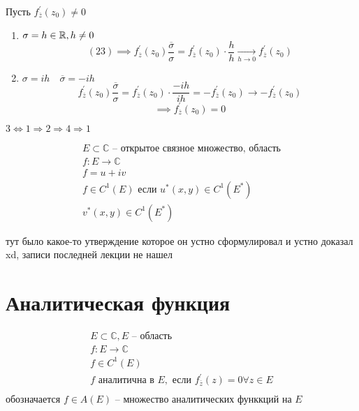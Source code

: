 \documentclass[main]{subfiles}
\begin{document}
\begin{longProof}
    Пусть $f^\prime_{\overline{z}}(z_0) \ne 0$
    \begin{enumerate}
        \item $\sigma = h \in \mathbb{R}, h \ne 0$
        \[ (23) \implies f^\prime_{\overline{z}}(z_0) \frac{\overline{\sigma}}{\sigma} = 
        f^\prime_{\overline{z}}(z_0) \cdot \frac{h}{h} \underset{h \to 0}{\longrightarrow} f^\prime_{\overline{z}}(z_0)\]
        \item $\sigma = ih \quad \overline{\sigma} = -ih$
        \[  f^\prime_{\overline{z}}(z_0) \frac{\overline{\sigma}}{\sigma} = f^\prime_{\overline{z}}(z_0) \cdot \frac{-ih}{ih} = -f^\prime_{\overline{z}}(z_0) \longrightarrow -f^\prime_{\overline{z}}(z_0) \] 
        \[ \implies f^\prime_{\overline{z}}(z_0) = 0 \]
    \end{enumerate}
    $3 \Leftrightarrow 1 \Rightarrow 2 \Rightarrow 4 \Rightarrow 1$
\end{longProof}

\begin{definition}
    \begin{gather*}
        E \subset \mathbb{C} \text{ -- открытое связное множество, область} \\
        f: E \rightarrow \mathbb{C} \\
        f = u + iv \\
        f \in C^1(E) \text{ если }
        u^*(x,y) \in C^1(E^*) \\
        v^*(x,y) \in C^1(E^*)
    \end{gather*}
\end{definition}

\begin{proposition}
    тут было какое-то утверждение которое он устно сформулировал и устно доказал xd, записи последней лекции не нашел
\end{proposition}

\section{Аналитическая функция}

\begin{definition}
    \begin{gather*}
        E \subset \mathbb{C}, E \text{ --  область} \\
        f: E \rightarrow \mathbb{C} \\
        f \in C^1(E) \\
        f \text{ аналитична в } E, \text{ если } f^\prime_{\overline{z}}(z) = 0 \forall z \in E \tag{1}  \\
    \end{gather*}
    обозначается  $f \in A(E)$ -- множество аналитических функкций на $E$
\end{definition}
\end{document}
